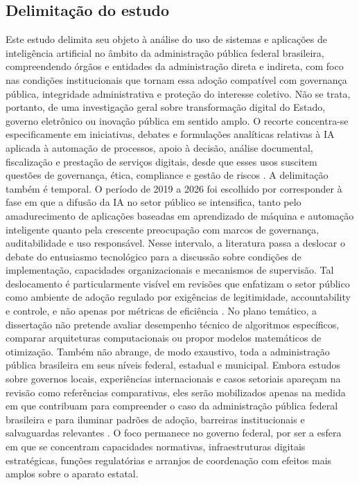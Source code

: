 \documentclass[12pt,a4paper]{article}
\begin{document}
\subsection{Delimitação do estudo}
\label{sec:orga79722b}
Este estudo delimita seu objeto à análise do uso de sistemas e aplicações de inteligência artificial no âmbito da administração pública federal brasileira, compreendendo órgãos e entidades da administração direta e indireta, com foco nas condições institucionais que tornam essa adoção compatível com governança pública, integridade administrativa e proteção do interesse coletivo. Não se trata, portanto, de uma investigação geral sobre transformação digital do Estado, governo eletrônico ou inovação pública em sentido amplo. O recorte concentra-se especificamente em iniciativas, debates e formulações analíticas relativas à IA aplicada à automação de processos, apoio à decisão, análise documental, fiscalização e prestação de serviços digitais, desde que esses usos suscitem questões de governança, ética, compliance e gestão de riscos \autocite{madan2022ai} \autocite{criado2024artificial} \autocite{lyrio2025emerging}.
A delimitação também é temporal. O período de 2019 a 2026 foi escolhido por corresponder à fase em que a difusão da IA no setor público se intensifica, tanto pelo amadurecimento de aplicações baseadas em aprendizado de máquina e automação inteligente quanto pela crescente preocupação com marcos de governança, auditabilidade e uso responsável. Nesse intervalo, a literatura passa a deslocar o debate do entusiasmo tecnológico para a discussão sobre condições de implementação, capacidades organizacionais e mecanismos de supervisão. Tal deslocamento é particularmente visível em revisões que enfatizam o setor público como ambiente de adoção regulado por exigências de legitimidade, accountability e controle, e não apenas por métricas de eficiência \autocite{sigfrids2022how} \autocite{batool2025ai} \autocite{lyrio2025emerging}.
No plano temático, a dissertação não pretende avaliar desempenho técnico de algoritmos específicos, comparar arquiteturas computacionais ou propor modelos matemáticos de otimização. Também não abrange, de modo exaustivo, toda a administração pública brasileira em seus níveis federal, estadual e municipal. Embora estudos sobre governos locais, experiências internacionais e casos setoriais apareçam na revisão como referências comparativas, eles serão mobilizados apenas na medida em que contribuam para compreender o caso da administração pública federal brasileira e para iluminar padrões de adoção, barreiras institucionais e salvaguardas relevantes \autocite{yiitcanlar2022artificial} \autocite{david2023understanding} \autocite{criado2024inteligencia}. O foco permanece no governo federal, por ser a esfera em que se concentram capacidades normativas, infraestruturas digitais estratégicas, funções regulatórias e arranjos de coordenação com efeitos mais amplos sobre o aparato estatal.
\end{document}
